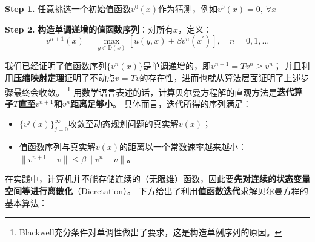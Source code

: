 \textbf{Step 1.} 任意挑选一个初始值函数$v^0(x)$作为猜测，例如$v^0(x) = 0,~ \forall x$

\textbf{Step 2.} \textbf{构造单调递增的值函数序列}：对所有$x$，定义：
\begin{equation*}
    v^{n+1}\left(x\right) = \max _{y\in\mathbb{D}(x)}
        \left[u\left(y,x\right)+\beta v^n\left(x^{\prime}\right)\right],\quad n = 0,1,\dots
\end{equation*}

我们已经证明了值函数序列$\{v^n(x)\}$是单调递增的，即$v^{n+1} = Tv^n \geq v^n$；
并且利用\textbf{压缩映射定理}证明了不动点$v=Tv$的存在性，进而也就从算法层面证明了上述步骤最终会收敛。
\footnote{Blackwell充分条件对单调性做出了要求，这是构造单例序列的原因。}
用数学语言表述的话，计算贝尔曼方程解的直观方法是\textbf{迭代算子$T$直至$v^{n+1}$和$v^n$距离足够小}。
具体而言，迭代所得的序列满足：
\begin{itemize}
    \item $\{v^j(x)\}_{j=0}^{\infty}$收敛至动态规划问题的真实解$v(x)$；
    \item 值函数序列与真实解$v(x)$的距离以一个常数速率越来越小：$\|v^{n+1}-v\| \leq \beta \|v^{n}-v\|$。
\end{itemize}

在实践中，计算机并不能存储连续的（无限维）函数，因此要\textbf{先对连续的状态变量空间等进行离散化}（Dicretation）。
下方给出了利用\textbf{值函数迭代}求解贝尔曼方程的基本算法：

